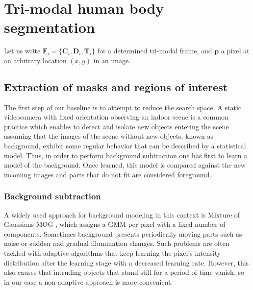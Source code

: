 \documentclass[10pt,twocolumn,letterpaper]{article}
\begin{document}
\section{Tri-modal human body segmentation}
\label{sec:trimodalhumanbodysegmentation}

Let us write $\mathbf{F}_i = \{\mathbf{C}_i, \mathbf{D}_i, \mathbf{T}_i\}$ for a determined tri-modal frame, and $\mathbf{p}$ a pixel at an arbitrary location $(x,y)$ in an image.

\subsection{Extraction of masks and regions of interest} 
\label{ssec:bsbb}

The first step of our baseline is to attempt to reduce the search space. A static videocamera with fixed orientation observing an indoor scene is a common practice which enables to detect and isolate new objects entering the scene assuming that the images of the scene without new objects, known as background, exhibit some regular behavior that can be described by a statistical model. Thus, in order to perform background subtraction one has first to learn a model of the background. Once learned, this model is compared against the new incoming images and parts that do not fit are considered foreground.

\subsubsection{Background subtraction}
\label{sect:bs}
 A widely used approach for background modeling in this context is Mixture of Gaussians MOG  \cite{bouwmans2008background}, which assigns a GMM per pixel with a fixed number of components. Sometimes background presents periodically moving parts such as noise or sudden and gradual illumination changes. Such problems are often tackled with adaptive algorithms that keep learning the pixel's intensity distribution after the learning stage with a decreased learning rate. However, this also causes that intruding objects that stand still for a period of time vanish, so in our case a non-adaptive approach is more convenient.
\end{document}
